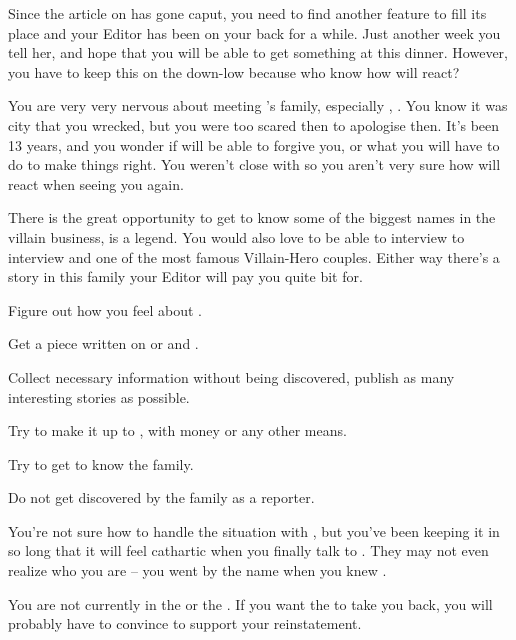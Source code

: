 \documentclass[char]{LRSguildcamp1}
\begin{document}
Since the article on \cYoungest{} has gone caput, you need to find another feature to fill its place and your Editor has been on your back for a while. Just another week you tell her, and hope that you will be able to get something at this dinner. However, you have to keep this on the down-low because who know how \cYoungest{\they} will react? 

You are very very nervous about meeting \cYoungest{}'s family, especially \cOS{\MYsupername}, \cOS{}. You know it was \cOS{\their} city that you wrecked, but you were too scared then to apologise then. It's been 13 years, and you wonder if \cOS{\they} will be able to forgive you, or what you will have to do to make things right. You weren't close with \cOS{} so you aren't very sure how \cOS{\they} will react when seeing you again. 

There is the great opportunity to get to know some of the biggest names in the villain business, \cGrandma{\MYsupername} is a legend. You would also love to be able to interview to interview \cOldest{\MYsupername} and \cOS{\MYsupername} one of the most famous Villain-Hero couples. Either way there's a story in this family your Editor will pay you quite bit for. 


\begin{itemz}[Goals]
	\item Figure out how you feel about \cYoungest{}. 
	\item Get a piece written on \cGrandma{} or \cOldest{} and \cOS{}. 
	\item Collect necessary information without being discovered, publish as many interesting stories as possible.
	\item Try to make it up to \cOS{}, with money or any other means.
	\item Try to get to know the family. 
	\item Do not get discovered by the family as a reporter. 
\end{itemz}

\begin{itemz}[Notes]
	\item You're not sure how to handle the situation with \cOS{}, but you've been keeping it in so long that it will feel cathartic when you finally talk to \cOS{\them}.  They may not even realize who you are -- you went by the name \cYSOldName{} when you knew \cOS{\them}. 
	\item You are not currently in the \cHeroLeague{\intro} or the \cVillainCompact{\intro}.  If you want the \cHeroLeague{} to take you back, you will probably have to convince \cYoungest{} to support your reinstatement. 

\end{itemz}
\end{document}
